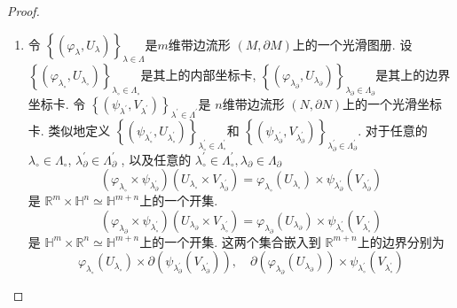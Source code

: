 \documentclass[../main.tex]{subfiles}
\begin{document}
\begin{proof}
\begin{enumerate}
    \item 令 \(  \left\{ \left(  \varphi _{ \lambda } ,U_{ \lambda }\right)  \right\}_{ \lambda \in  \Lambda }  \)是\(  m  \)维带边流形  \(  \left( M, \partial M \right)   \)上的一个光滑图册. 设 \(  \left\{ \left(  \varphi _{ \lambda _\circ },U_{\lambda _\circ } \right)  \right\}_{ \lambda_{\circ} \in  \Lambda _{\circ}}  \)是其上的内部坐标卡,  \(  \left\{ \left(  \varphi _{ \lambda _ \partial }, U_{ \lambda _{ \partial }} \right)  \right\}_{ \lambda _{ \partial }\in  \Lambda _{ \partial }}  \)是其上的边界坐标卡.  令 \(  \left\{ \left( \psi _{ \lambda ^{\prime} }, V_{ \lambda ^{\prime} } \right)  \right\}_{ \lambda ^{\prime} \in  \Lambda ^{\prime} }  \)是 \(  n  \)维带边流形  \(  \left( N, \partial N \right)   \)上的一个光滑坐标卡. 类似地定义 \(  \left\{ \left( \psi _{ \lambda_{\circ} ^{\prime} },U_{ \lambda_{\circ} ^{\prime} } \right)  \right\}_{ \lambda ^{\prime} _{\circ}\in \Lambda _{\circ}^{\prime} }   \)和 \(  \left\{\left(  \psi _{ \lambda _{ \partial }^{\prime} } ,V_{ \lambda ^{\prime} _{ \partial }}\right)  \right\}_{ \lambda _{ \partial }^{\prime} \in  \Lambda _{ \partial }^{\prime} }  \). 对于任意的 \(   \lambda_{\circ} \in  \Lambda _{\circ}  \), \(   \lambda _{ \partial }^{\prime} \in  \Lambda _{ \partial }^{\prime}   \)          ,  以及任意的 \(    \lambda _{\circ}^{\prime} \in  \Lambda _{\circ}^{\prime} , \lambda _{ \partial }\in  \Lambda _{ \partial }  \) \[
    \left(  \varphi _{ \lambda_{\circ} }\times \psi _{ \lambda ^{\prime} _{ \partial }} \right)\left( U_{ \lambda_{\circ} }\times V_{ \lambda _{ \partial }^{\prime} } \right)=  \varphi  _{ \lambda_{\circ} }\left( U_{ \lambda_{\circ} } \right)\times \psi _{ \lambda _{ \partial }^{\prime} }\left( V_{ \lambda _{ \partial }^{\prime} } \right)    
    \]是 \(  \mathbb{R} ^{m}\times \mathbb{H}^{n}\simeq \mathbb{H}^{m+ n}  \)上的一个开集.  \[
    \left(  \varphi _{ \lambda _{ \partial }}\times \psi _{ \lambda _{\circ}^{\prime} } \right)\left( U_{ \lambda _{ \partial }} \times V_{ \lambda _\circ^{\prime} }\right)=  \varphi _{ \lambda _{ \partial }}\left( U_{ \lambda _{ \partial }} \right)\times \psi _{ \lambda _{\circ}^{\prime} }\left( V_{ \lambda _{\circ}^{\prime} } \right)    
    \] 是 \(\mathbb{H}^{m}\times \mathbb{R} ^{n}\simeq   \mathbb{H}^{m+ n}  \)上的一个开集.  这两个集合嵌入到 \(  \mathbb{R} ^{m+ n}  \)上的边界分别为 \[
     \varphi _{ \lambda _{\circ}}\left( U_{ \lambda _{\circ}} \right)\times  \partial \left( \psi _{ \lambda _{ \partial }^{\prime} }\left( V_{ \lambda _{ \partial }^{\prime} } \right)  \right),\quad   \partial \left(  \varphi _{ \lambda _{ \partial }}\left( U_{ \lambda _{ \partial }} \right)  \right)\times \psi _{ \lambda _{\circ}^{\prime} }\left( V_{ \lambda _{\circ}^{\prime} } \right)    
\]
\end{enumerate}
\end{proof}
\end{document}
